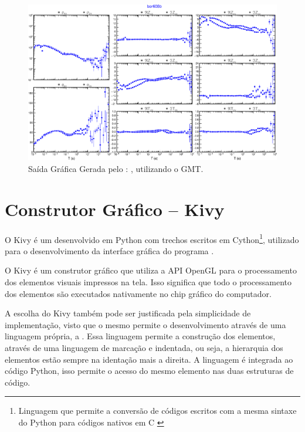     
        \begin{figure}[H]
            \caption{Saída Gráfica Gerada pelo :  \cite{geoma-proc}, utilizando o GMT.}
                \begin{center}
                    \includegraphics[width=15cm]{texto/figura/plot-cmp-tf.png}
                \end{center}
            \label{plot-cmp-tf}
        \end{figure}

    
    \section{Construtor Gráfico -- Kivy}

        O Kivy é um  desenvolvido em Python com trechos escritos em Cython\footnote{Linguagem que permite  a conversão de códigos escritos com a mesma sintaxe do Python para códigos nativos em C \cite{cython}}, utilizado para o desenvolvimento da interface gráfica do programa \cite{kivy}.
        
        O Kivy é um construtor gráfico que utiliza a API OpenGL \cite{opengl} para o processamento dos elementos visuais impressos na tela. Isso significa que todo o processamento dos elementos são executados nativamente no chip gráfico do computador.
        
        A escolha do Kivy também pode ser justificada pela simplicidade de implementação, visto que o mesmo permite o desenvolvimento através de uma linguagem própria, a  \cite{kvlang}. Essa linguagem permite a construção dos elementos, através de uma linguagem de marcação e indentada, ou seja, a hierarquia dos elementos estão sempre na identação mais a direita. A linguagem  é integrada ao código Python, isso permite o acesso do mesmo elemento nas duas estruturas de código.
